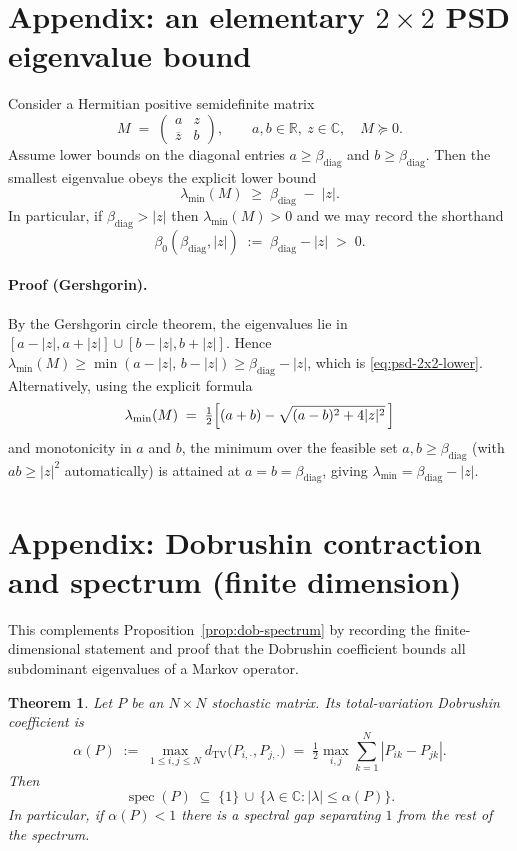 \documentclass[11pt]{amsart}
\theoremstyle{plain}
\newtheorem{theorem}{Theorem}[section]
\theoremstyle{definition}
\theoremstyle{remark}
\begin{document}
\section{Appendix: an elementary $2\times 2$ PSD eigenvalue bound}

Consider a Hermitian positive semidefinite matrix
\[
  M\;=\;\begin{pmatrix} a & z \\ \overline{z} & b \end{pmatrix},\qquad a,b\in\mathbb{R},\ z\in\mathbb{C},\quad M\succeq 0.
\]
Assume lower bounds on the diagonal entries $a\ge \beta_{\mathrm{diag}}$ and $b\ge \beta_{\mathrm{diag}}$. Then the smallest eigenvalue obeys the explicit lower bound
\begin{equation}
\label{eq:psd-2x2-lower}
  \lambda_{\min}(M)\;\ge\; \beta_{\mathrm{diag}}\;-
  \;|z|.
\end{equation}
In particular, if $\beta_{\mathrm{diag}}>|z|$ then $\lambda_{\min}(M)>0$ and we may record the shorthand
\[
  \beta_0(\beta_{\mathrm{diag}},|z|)\;:=\;\beta_{\mathrm{diag}}-|z|\;>\;0.
\]

\paragraph{Proof (Gershgorin).}
By the Gershgorin circle theorem, the eigenvalues lie in $[a-|z|,a+|z|]\cup[b-|z|,b+|z|]$. Hence $\lambda_{\min}(M)\ge \min(a-|z|,\,b-|z|)\ge \beta_{\mathrm{diag}}-|z|$, which is \eqref{eq:psd-2x2-lower}. Alternatively, using the explicit formula
\[
  \lambda_{\min}(M)\;=\;\tfrac12\Bigl[(a+b)-\sqrt{(a-b)^2+4|z|^2}\,\Bigr]
\]
and monotonicity in $a$ and $b$, the minimum over the feasible set $a,b\ge\beta_{\mathrm{diag}}$ (with $ab\ge |z|^2$ automatically) is attained at $a=b=\beta_{\mathrm{diag}}$, giving $\lambda_{\min}=\beta_{\mathrm{diag}}-|z|$.
\section{Appendix: Dobrushin contraction and spectrum (finite dimension)}

This complements Proposition~\ref{prop:dob-spectrum} by recording the finite-dimensional statement and proof that the Dobrushin coefficient bounds all subdominant eigenvalues of a Markov operator.

\begin{theorem}
Let $P$ be an $N\times N$ stochastic matrix. Its total-variation Dobrushin coefficient is
\[
  \alpha(P)\;:=\;\max_{1\le i,j\le N} d_{\mathrm{TV}}\bigl(P_{i,\cdot},P_{j,\cdot}\bigr)
  \;=\;\tfrac12\max_{i,j}\sum_{k=1}^N |P_{ik}-P_{jk}|.
\]
Then
\[
  \operatorname{spec}(P)\;\subseteq\;\{1\}\,\cup\,\{\lambda\in\mathbb{C}: |\lambda|\le \alpha(P)\}.
\]
In particular, if $\alpha(P)<1$ there is a spectral gap separating $1$ from the rest of the spectrum.
\end{theorem}
\end{document}
